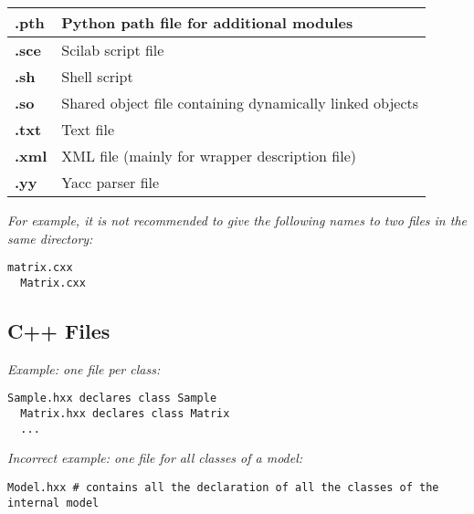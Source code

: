 \begin{tabular}{|l|p{15cm}|}
  \hline {\bf .pth} & Python path file for additional modules \\
  \hline {\bf .sce} & Scilab script file \\
  \hline {\bf .sh} & Shell script \\
  \hline {\bf .so} & Shared object file containing dynamically linked objects \\
  \hline {\bf .txt} & Text file \\
  \hline {\bf .xml} & XML file (mainly for wrapper description file) \\
  \hline {\bf .yy} & Yacc parser file \\
  \hline
\end{tabular}


\emph{For example, it is not recommended to give the following names to two files in the same directory:}
\begin{lstlisting}[frame=TRBL]
  matrix.cxx
  Matrix.cxx
\end{lstlisting}

\subsection{C++ Files}

\emph{Example: one file per class:}
\begin{lstlisting}[frame=TBRL]
  Sample.hxx declares class Sample
  Matrix.hxx declares class Matrix
  ...
\end{lstlisting}

\emph{Incorrect example: one file for all classes of a model:}
\begin{lstlisting}[frame=TRLB]
  Model.hxx # contains all the declaration of all the classes of the internal model
\end{lstlisting}

